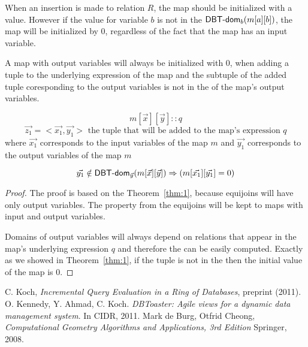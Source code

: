 \documentclass[12pt]{article}
\begin{document}
When an insertion is made to relation $R$, the map should be initialized with a value. However if the value for variable $b$ is not in the  $\textsf{DBT-dom}{}_{b}(m[a][b])$, the map will be initialized by 0, regardless of the fact that the map has an input variable.

\begin{theorem}
A map with output variables will always be initialized with 0, when adding a tuple to the underlying expression of the map and the subtuple of the added tuple coresponding to the output variables is not in the \dom{} of the map's output variables. 
\end{theorem}
$$m[\vec{x}][\vec{y}]::q$$
$$\vec{z_{1}}=<\vec{x_{1}},\vec{y_{1}}>\mbox{ the tuple that will be added to the map's expression } q$$
where $\vec{x_{1}}$ corresponds to the input variables of the map $m$ and $\vec{y_{1}}$ corresponds to the output variables of the map $m$

$$\vec{y_{1}}\notin\textsf{DBT-dom}{}_{\vec{y}}(m[\vec{x}][\vec{y}])\Rightarrow (m[\vec{x_{1}}][\vec{y_{1}}]=0)$$

\begin{proof}
The proof is based on the Theorem~\ref{thm:1}, because equijoins will have only output variables. The property from the equijoins will be kept to maps with input and output variables.

Domains of output variables will always depend on relations that appear in the map's underlying expression $q$ and therefore the \dom{} can be easily computed. Exactly as we showed in Theorem~\ref{thm:1}, if the tuple is not in the \dom{} then the initial value of the map is 0.
\end{proof}

\begin{thebibliography}{9}
 C. Koch, \emph{Incremental Query Evaluation in a Ring of Databases},  preprint (2011).
 O. Kennedy, Y. Ahmad, C. Koch. \emph{DBToaster: Agile views for a dynamic data management system}. In CIDR, 2011.
 Mark de Burg, Otfrid Cheong, \emph{Computational Geometry Algorithms and Applications, 3rd Edition} Springer, 2008.
\end{thebibliography}
\end{document}
